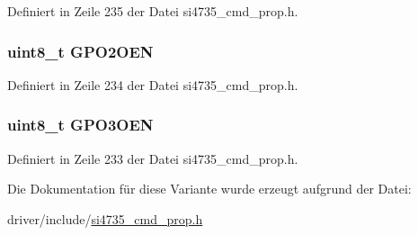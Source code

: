 Definiert in Zeile 235 der Datei si4735\+\_\+cmd\+\_\+prop.\+h.

\hypertarget{unionfm__gpio__ctl__arg1_aa16577946f684dfeeee75c5552b2cf32}{}
\subsubsection[{G\+P\+O2\+O\+E\+N}]{\setlength{\rightskip}{0pt plus 5cm}uint8\+\_\+t G\+P\+O2\+O\+E\+N}\label{unionfm__gpio__ctl__arg1_aa16577946f684dfeeee75c5552b2cf32}


Definiert in Zeile 234 der Datei si4735\+\_\+cmd\+\_\+prop.\+h.

\hypertarget{unionfm__gpio__ctl__arg1_a64a711e579f7c8b59e983c9bd6f9dfca}{}
\subsubsection[{G\+P\+O3\+O\+E\+N}]{\setlength{\rightskip}{0pt plus 5cm}uint8\+\_\+t G\+P\+O3\+O\+E\+N}\label{unionfm__gpio__ctl__arg1_a64a711e579f7c8b59e983c9bd6f9dfca}


Definiert in Zeile 233 der Datei si4735\+\_\+cmd\+\_\+prop.\+h.



Die Dokumentation für diese Variante wurde erzeugt aufgrund der Datei\+:\begin{DoxyCompactItemize}
\item 
driver/include/\hyperlink{si4735__cmd__prop_8h}{si4735\+\_\+cmd\+\_\+prop.\+h}\end{DoxyCompactItemize}
